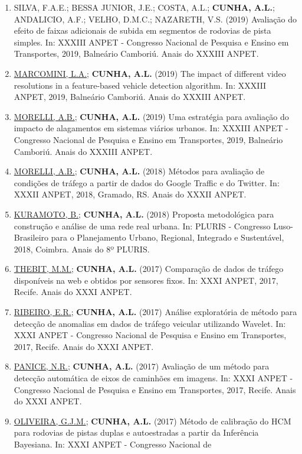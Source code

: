 \documentclass[
  brazilian,
  11pt,
  a4paper,
]{article}
\begin{document}
\begin{enumerate}
  ANPET.
\item
  SILVA, F.A.E.; BESSA JUNIOR, J.E.; COSTA, A.L.; \textbf{CUNHA, A.L.};
  ANDALICIO, A.F.; VELHO, D.M.C.; NAZARETH, V.S. (2019) Avaliação do
  efeito de faixas adicionais de subida em segmentos de rodovias de
  pista simples. In: XXXIII ANPET - Congresso Nacional de Pesquisa e
  Ensino em Transportes, 2019, Balneário Camboriú. Anais do XXXIII
  ANPET.
\item
  \ul{MARCOMINI, L.A.}; \textbf{CUNHA, A.L.} (2019) The impact of
  different video resolutions in a feature-based vehicle detection
  algorithm. In: XXXIII ANPET, 2019, Balneário Camboriú. Anais do XXXIII
  ANPET.
\item
  \ul{MORELLI, A.B.}; \textbf{CUNHA, A.L.} (2019) Uma estratégia para
  avaliação do impacto de alagamentos em sistemas viários urbanos. In:
  XXXIII ANPET - Congresso Nacional de Pesquisa e Ensino em Transportes,
  2019, Balneário Camboriú. Anais do XXXIII ANPET.
\item
  \ul{MORELLI, A.B.}; \textbf{CUNHA, A.L.} (2018) Métodos para avaliação
  de condições de tráfego a partir de dados do Google Traffic e do
  Twitter. In: XXXII ANPET, 2018, Gramado, RS. Anais do XXXII ANPET.
\item
  \ul{KURAMOTO, B.}; \textbf{CUNHA, A.L.} (2018) Proposta metodológica
  para construção e análise de uma rede real urbana. In: PLURIS -
  Congresso Luso-Brasileiro para o Planejamento Urbano, Regional,
  Integrado e Sustentável, 2018, Coimbra. Anais do 8º PLURIS.
\item
  \ul{THEBIT, M.M.}; \textbf{CUNHA, A.L.} (2017) Comparação de dados de
  tráfego disponíveis na web e obtidos por sensores fixos. In: XXXI
  ANPET, 2017, Recife. Anais do XXXI ANPET.
\item
  \ul{RIBEIRO, E.R.}; \textbf{CUNHA, A.L.} (2017) Análise exploratória
  de método para detecção de anomalias em dados de tráfego veicular
  utilizando Wavelet. In: XXXI ANPET - Congresso Nacional de Pesquisa e
  Ensino em Transportes, 2017, Recife. Anais do XXXI ANPET.
\item
  \ul{PANICE, N.R.}; \textbf{CUNHA, A.L.} (2017) Avaliação de um método
  para detecção automática de eixos de caminhões em imagens. In: XXXI
  ANPET - Congresso Nacional de Pesquisa e Ensino em Transportes, 2017,
  Recife. Anais do XXXI ANPET.
\item
  \ul{OLIVEIRA, G.J.M.}; \textbf{CUNHA, A.L.} (2017) Método de
  calibração do HCM para rodovias de pistas duplas e autoestradas a
  partir da Inferência Bayesiana. In: XXXI ANPET - Congresso Nacional de

\end{enumerate}
\end{document}
